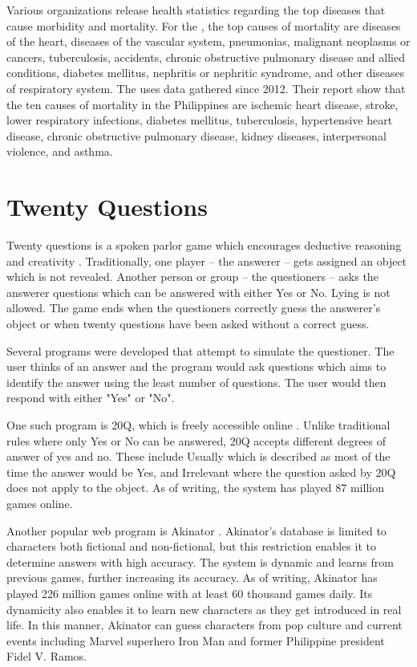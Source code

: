 Various organizations release health statistics regarding the top diseases that cause morbidity and mortality. 
For the \citet{phdoh:2016}, the top causes of mortality are diseases of the heart, diseases of the vascular system, pneumonias, malignant neoplasms or cancers, tuberculosis, accidents, chronic obstructive pulmonary disease and allied conditions, diabetes mellitus, nephritis or nephritic syndrome, and other diseases of respiratory system. 
The \citet{who:2015} uses data gathered since 2012.
Their report show that the ten causes of mortality in the Philippines are ischemic heart disease, stroke, lower respiratory infections, diabetes mellitus, tuberculosis, hypertensive heart disease, chronic obstructive pulmonary disease, kidney diseases, interpersonal violence, and asthma.

\section{Twenty Questions}
Twenty questions is a spoken parlor game which encourages deductive reasoning and creativity \cite{wiki:twenty_questions}.
Traditionally, one player -- the answerer -- gets assigned an object which is not revealed.
Another person or group -- the questioners -- asks the answerer questions which can be answered with either Yes or No. 
Lying is not allowed.
The game ends when the questioners correctly guess the answerer's object or when twenty questions have been asked without a correct guess.

Several programs were developed that attempt to simulate the questioner. 
The user thinks of an answer and the program would ask questions which aims to identify the answer using the least number of questions. The user would then respond with either "Yes" or "No".

One such program is 20Q, which is freely accessible online \cite{20q:2016}. 
Unlike traditional rules where only Yes or No can be answered, 20Q accepts different degrees of answer of yes and no.
These include Usually which is described as most of the time the answer would be Yes, and Irrelevant where the question asked by 20Q does not apply to the object.
As of writing, the system has played 87 million games online.

Another popular web program is Akinator \cite{Akinator:2016}.
Akinator's database is limited to characters both fictional and non-fictional, but this restriction enables it to determine answers with high accuracy.
The system is dynamic and learns from previous games, further increasing its accuracy.
As of writing, Akinator has played 226 million games online with at least 60 thousand games daily.
Its dynamicity also enables it to learn new characters as they get introduced in real life.
In this manner, Akinator can guess characters from pop culture and current events including Marvel superhero Iron Man and former Philippine president Fidel V. Ramos.

